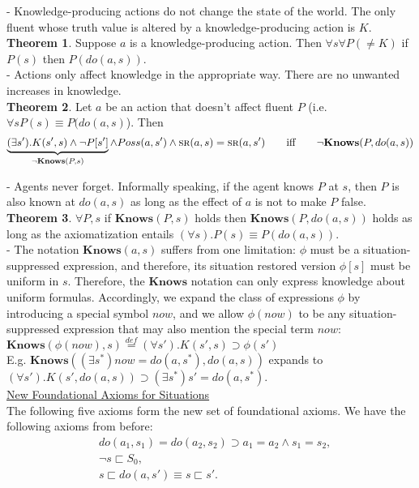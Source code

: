\documentclass[fleqn]{report}
\begin{document}
- Knowledge-producing actions do not change the state of the world. The only fluent whose truth value is altered by a knowledge-producing action is $K$.\\
\textbf{Theorem 1}. Suppose $a$ is a knowledge-producing action. Then $\forall s\forall P(\neq K)$ if $P(s)$ then $P(do(a,s))$.\\

- Actions only affect knowledge in the appropriate way. There are no unwanted increases in knowledge.\\
\textbf{Theorem 2}. Let $a$ be an action that doesn't affect fluent $P$ (i.e. $\forall s P(s)\equiv P(do(a,s)$). Then
\[\underbrace{(\exists s').K(s',s)\land \neg P[s']}_{\neg\textbf{Knows}(P,s)}\land Poss(a,s') \land \textsc{sr}(a,s)=\textsc{sr}(a,s') \qquad \text{iff} \qquad \neg\textbf{Knows}(P,do(a,s))\]

- Agents never forget. Informally speaking, if the agent knows $P$ at $s$, then $P$ is also known at $do(a,s)$ as long as the effect of $a$ is not to make $P$ false.\\
\textbf{Theorem 3}. $\forall P,s$ if $\textbf{Knows}(P,s)$ holds then $\textbf{Knows}(P,do(a,s))$ holds as long as the axiomatization entails $(\forall s).P(s)\equiv P(do(a,s))$.\\

- The notation $\textbf{Knows}(a,s)$ suffers from one limitation: $\phi$ must be a situation-suppressed expression, and therefore, its situation restored version $\phi[s]$ must be
uniform in $s$. Therefore, the $\textbf{Knows}$ notation can only express knowledge about uniform formulas. Accordingly, we expand the class of expressions $\phi$ by introducing a special symbol $now$, and we allow $\phi(now)$ to
be any situation-suppressed expression that may also mention the special term $now$:\\

$\textbf{Knows}(\phi(now),s)\stackrel{def}{=}(\forall s'). K(s',s) \supset \phi(s')$\\

E.g. $\textbf{Knows}((\exists s^*)now=do(a,s^*),do(a,s))$ expands to $(\forall s').K(s',do(a,s))\supset(\exists s^*)s'=do(a,s^*).$\\

\underline{New Foundational Axioms for Situations}\\
The following five axioms form the new set of foundational axioms. We have the following axioms from before:
\begin{align}
&do(a_1,s_1)=do(a_2,s_2) \supset a_1=a_2\land s_1=s_2,\\
&\neg s \sqsubset S_0,\\
& s\sqsubset do(a,s')\equiv s\sqsubset s'.
\end{align}
\end{document}
